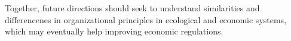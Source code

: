 % 
% 
% 
% 
% 
Together, future directions should seek to understand similarities and differencenes in organizational principles in ecological and economic systems, which may eventually help improving economic regulations.

%   

% 
% 
% 
% 
% 

% 
% 

% 
% 


